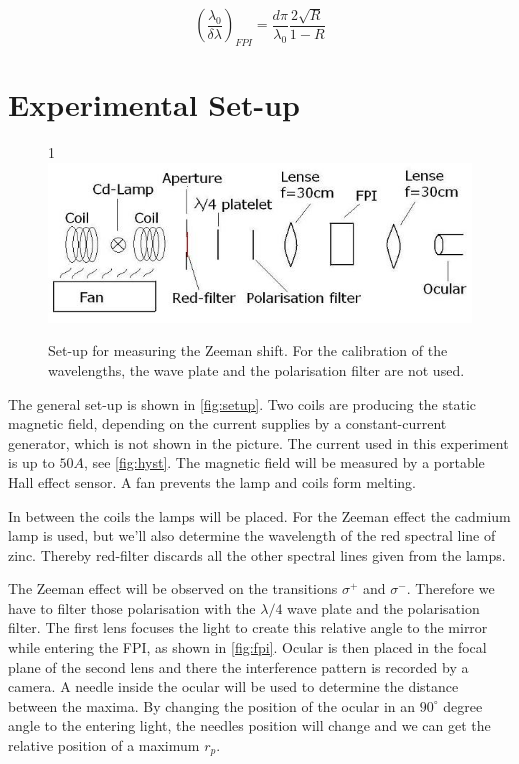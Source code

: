 \documentclass[]{article}
\begin{document}
\begin{equation}
\left(\frac{\lambda_0}{\delta\lambda}\right)_{FPI} = \frac{d\pi}{\lambda_0}\frac{2\sqrt{R}}{1-R}
\label{eq:resolving cap}
\end{equation}


\newpage
\section{Experimental Set-up}
\begin{figure}[H]1
\centering
\includegraphics[width=1\textwidth]{Plots/SetupZeeman.jpg}
\caption{Set-up for measuring the Zeeman shift. For the calibration of the wavelengths, the wave plate and the polarisation filter are not used.}
\label{fig:setup}
\end{figure}

The general set-up is shown in \autoref{fig:setup}. Two coils are producing the static magnetic field, depending on the current supplies by a constant-current generator, which is not shown in the picture. The current used in this experiment is up to $50 A$, see \autoref{fig:hyst}. The magnetic field will be measured by a portable Hall effect sensor. A fan prevents the lamp and coils form melting.

In between the coils the lamps will be placed. For the Zeeman effect the cadmium lamp is used, but we'll also determine the wavelength of the red spectral line of zinc. Thereby red-filter discards all the other spectral lines given from the lamps.

The Zeeman effect will be observed on the transitions $\sigma^+$ and $\sigma^-$. Therefore we have to filter those polarisation with the $\lambda/4$ wave plate and the polarisation filter. The first lens focuses the light to create this relative angle to the mirror while entering the FPI, as shown in \autoref{fig:fpi}. Ocular is then placed in the focal plane of the second lens and there the interference pattern is recorded by a camera. A needle inside the ocular will be used to determine the distance between the maxima. By changing the position of the ocular in an $90^\circ$ degree angle to the entering light, the needles position will change and we can get the relative position of a maximum $r_p$.
\end{document}
